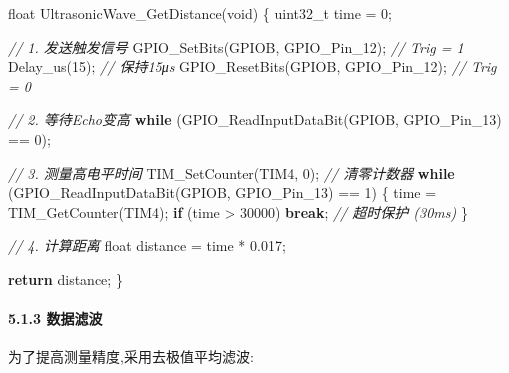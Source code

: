 \documentclass[
]{article}
\newenvironment{Shaded}{}{}
\newcommand{\CommentTok}[1]{\textcolor[rgb]{0.38,0.63,0.69}{\textit{#1}}}
\newcommand{\ControlFlowTok}[1]{\textcolor[rgb]{0.00,0.44,0.13}{\textbf{#1}}}
\newcommand{\DataTypeTok}[1]{\textcolor[rgb]{0.56,0.13,0.00}{#1}}
\newcommand{\DecValTok}[1]{\textcolor[rgb]{0.25,0.63,0.44}{#1}}
\newcommand{\FloatTok}[1]{\textcolor[rgb]{0.25,0.63,0.44}{#1}}
\newcommand{\NormalTok}[1]{#1}
\begin{document}
\begin{Shaded}
\begin{Highlighting}[]
\DataTypeTok{float}\NormalTok{ UltrasonicWave\_GetDistance(}\DataTypeTok{void}\NormalTok{)}
\NormalTok{\{}
    \DataTypeTok{uint32\_t}\NormalTok{ time = }\DecValTok{0}\NormalTok{;}
    
    \CommentTok{// 1. 发送触发信号}
\NormalTok{    GPIO\_SetBits(GPIOB, GPIO\_Pin\_12);   }\CommentTok{// Trig = 1}
\NormalTok{    Delay\_us(}\DecValTok{15}\NormalTok{);                        }\CommentTok{// 保持15μs}
\NormalTok{    GPIO\_ResetBits(GPIOB, GPIO\_Pin\_12); }\CommentTok{// Trig = 0}
    
    \CommentTok{// 2. 等待Echo变高}
    \ControlFlowTok{while}\NormalTok{ (GPIO\_ReadInputDataBit(GPIOB, GPIO\_Pin\_13) == }\DecValTok{0}\NormalTok{);}
    
    \CommentTok{// 3. 测量高电平时间}
\NormalTok{    TIM\_SetCounter(TIM4, }\DecValTok{0}\NormalTok{);  }\CommentTok{// 清零计数器}
    \ControlFlowTok{while}\NormalTok{ (GPIO\_ReadInputDataBit(GPIOB, GPIO\_Pin\_13) == }\DecValTok{1}\NormalTok{) \{}
\NormalTok{        time = TIM\_GetCounter(TIM4);}
        \ControlFlowTok{if}\NormalTok{ (time \textgreater{} }\DecValTok{30000}\NormalTok{) }\ControlFlowTok{break}\NormalTok{;  }\CommentTok{// 超时保护 (30ms)}
\NormalTok{    \}}
    
    \CommentTok{// 4. 计算距离}
    \DataTypeTok{float}\NormalTok{ distance = time * }\FloatTok{0.017}\NormalTok{;}
    
    \ControlFlowTok{return}\NormalTok{ distance;}
\NormalTok{\}}
\end{Highlighting}
\end{Shaded}

\hypertarget{ux6570ux636eux6ee4ux6ce2}{%
\paragraph{5.1.3 数据滤波}\label{ux6570ux636eux6ee4ux6ce2}}

为了提高测量精度,采用去极值平均滤波:
\end{document}
